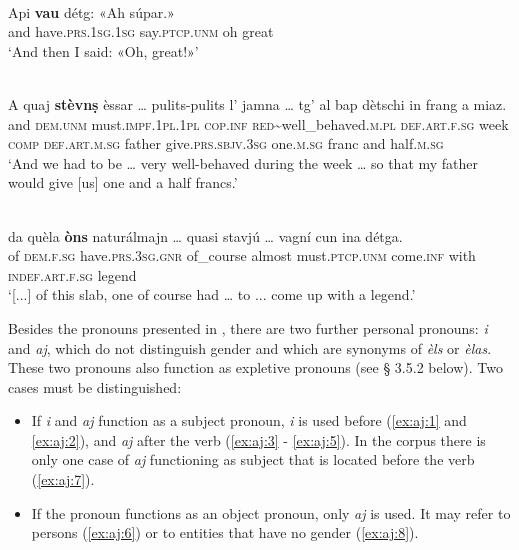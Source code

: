 \ea
\label{}
\\
\gll Api \textbf{vau} détg: «Ah súpar.»   \\
and have.\textsc{prs.1sg.1sg} say.\textsc{ptcp.unm} oh great\\
\glt `And then I said: «Oh, great!»'
\z

\ea
\label{}
\\
\gll    A quaj \textbf{stèvnṣ} èssar … pulits-pulits l’ jamna … tg’ al bap dètschi in frang a miaz.\\
and \textsc{dem.unm} must.\textsc{impf.1pl.1pl} \textsc{cop.inf} {} \textsc{red}\textasciitilde{well\_behaved}.\textsc{m.pl} \textsc{def.art.f.sg} week {} \textsc{comp} \textsc{def.art.m.sg} father  give.\textsc{prs.sbjv.3sg} one.\textsc{m.sg} franc and half.\textsc{m.sg}\\
\glt `And we had to be … very well-behaved during the week … so that my father would give [us] one and a half francs.'
\z

\ea
\label{}
\\
\gll    [...] da quèla \textbf{òns} naturálmajn … quasi stavjú … vagní cun ina détga.\\
{} of \textsc{dem.f.sg} have.\textsc{prs.3sg.gnr} of\_course almost must.\textsc{ptcp.unm} {} come.\textsc{inf} with \textsc{indef.art.f.sg} legend\\
\glt `[...] of this slab, one of course had … to ... come up with a legend.'
\z

Besides the pronouns presented in , there are two further personal pronouns: \textit{i} and \textit{aj}, which do not distinguish gender and which are synonyms of \textit{èls} or \textit{èlas}. These two pronouns also function as expletive pronouns (see § 3.5.2 below). Two cases must be distinguished:

\begin{itemize}
\item If \textit{i} and \textit{aj} function as a subject pronoun, \textit{i} is used before (\ref{ex:aj:1} and \ref{ex:aj:2}), and \textit{aj} after the verb (\ref{ex:aj:3} - \ref{ex:aj:5}). In the corpus there is only one case of \textit{aj} functioning as subject that is located before the verb (\ref{ex:aj:7}).
\item If the pronoun functions as an object pronoun, only \textit{aj} is used. It may refer to persons (\ref{ex:aj:6}) or to entities that have no gender (\ref{ex:aj:8}).
\end{itemize}

